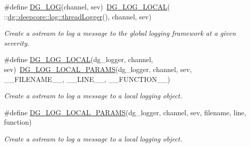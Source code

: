 \begin{DoxyCompactItemize}
\#define \hyperlink{group___utility_module_gaccdc4ecc408590a0c9e70a014e36df03}{D\+G\+\_\+\+L\+OG}(channel,  sev)~\hyperlink{group___utility_module_gaf0f303ba463f71805710b4ad637b5140}{D\+G\+\_\+\+L\+O\+G\+\_\+\+L\+O\+C\+AL}( \+::\hyperlink{group___utility_module_ga94a3335f72a1830e58c8386c35015b2b}{dg\+::deepcore\+::log\+::thread\+Logger}(), channel, sev)
\begin{DoxyCompactList}\small\item\em Create a ostream to log a message to the global logging framework at a given severity. \end{DoxyCompactList}\item 
\#define \hyperlink{group___utility_module_gaf0f303ba463f71805710b4ad637b5140}{D\+G\+\_\+\+L\+O\+G\+\_\+\+L\+O\+C\+AL}(dg\+\_\+logger,  channel,  sev)~\hyperlink{group___utility_module_ga5da92d91fa3446e9251ec613e360b8d5}{D\+G\+\_\+\+L\+O\+G\+\_\+\+L\+O\+C\+A\+L\+\_\+\+P\+A\+R\+A\+MS}(dg\+\_\+logger, channel, sev, \+\_\+\+\_\+\+F\+I\+L\+E\+N\+A\+M\+E\+\_\+\+\_\+, \+\_\+\+\_\+\+L\+I\+N\+E\+\_\+\+\_\+, \+\_\+\+\_\+\+F\+U\+N\+C\+T\+I\+O\+N\+\_\+\+\_\+)
\begin{DoxyCompactList}\small\item\em Create a ostream to log a message to a local logging object. \end{DoxyCompactList}\item 
\#define \hyperlink{group___utility_module_ga5da92d91fa3446e9251ec613e360b8d5}{D\+G\+\_\+\+L\+O\+G\+\_\+\+L\+O\+C\+A\+L\+\_\+\+P\+A\+R\+A\+MS}(dg\+\_\+logger,  channel,  sev,  filename,  line,  function)
\begin{DoxyCompactList}\small\item\em Create a ostream to log a message to a local logging object. \end{DoxyCompactList}\end{DoxyCompactItemize}
